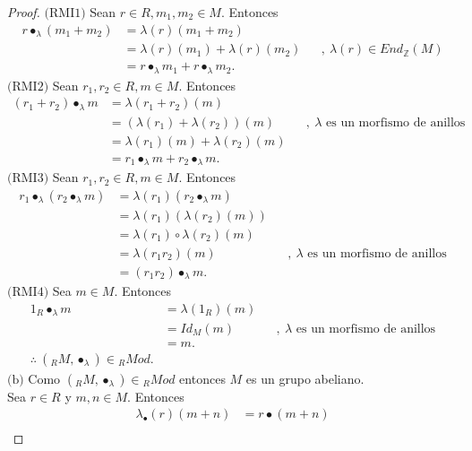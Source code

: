 \documentclass{article}
\newcommand{\lrprth}[1]{
    \left(#1\right)
}
\newcommand{\zend}[2]{
    End_{\mathbb{Z}}^{#2}\lrprth{#1}
}
\theoremstyle{definition}
\theoremstyle{plain}
\theoremstyle{plain}
\theoremstyle{definition}
\theoremstyle{definition}
\theoremstyle{definition}
\theoremstyle{definition}
\theoremstyle{definition}
\theoremstyle{definition}
\begin{document}
\begin{enumerate}
\begin{proof}
    $\boxed{\text{(RMI1)}}$ Sean $r\in R, m_1,m_2\in M$. Entonces
    \begin{align*}
        r\bullet_{\lambda}\lrprth{m_1+m_2}&=\lambda(r)\lrprth{m_1+m_2}\\
        &=\lambda(r)\lrprth{m_1}+\lambda(r)\lrprth{m_2} && ,\ \lambda(r)\in \zend{M}{}\\
        &=r\bullet_\lambda m_1+r\bullet_\lambda m_2.
    \end{align*}
    $\boxed{\text{(RMI2)}}$ Sean $r_1,r_2\in R, m\in M$. Entonces
    \begin{align*}
        \lrprth{r_1+r_2}\bullet_\lambda m &=\lambda\lrprth{r_1+r_2}\lrprth{m}\\
        &=\lrprth{\lambda(r_1)+\lambda(r_2)}\lrprth{m} && ,\ \lambda\text{ es un morfismo de anillos}\\
        &=\lambda(r_1)\lrprth{m}+\lambda(r_2)\lrprth{m}\\
        &=r_1\bullet_\lambda m+r_2\bullet_\lambda m.
    \end{align*}
    $\boxed{\text{(RMI3)}}$ Sean $r_1,r_2\in R, m\in M$. Entonces
    \begin{align*}
        r_1\bullet_\lambda\lrprth{r_2\bullet_\lambda m}&= \lambda(r_1)\lrprth{r_2\bullet_\lambda m}\\
        &=\lambda(r_1)\lrprth{\lambda(r_2)\lrprth{m}}\\
        &=\lambda(r_1)\circ\lambda(r_2)\lrprth{m}\\
        &=\lambda(r_1r_2)\lrprth{m} && ,\ \lambda\text{ es un morfismo de anillos}\\
        &=\lrprth{r_1r_2}\bullet_\lambda m.
    \end{align*}
    $\boxed{\text{(RMI4)}}$ Sea $m\in M$. Entonces
    \begin{align*}
        1_R\bullet_\lambda m&=\lambda(1_R)\lrprth{m}\\
        &=Id_M\lrprth{m} && ,\ \lambda\text{ es un morfismo de anillos}\\
        &=m.\\
        \therefore\ \lrprth{{}_RM,\bullet_\lambda}\in{}_RMod.
    \end{align*}
    $\boxed{\text{(b)}}$ Como $\lrprth{{}_RM,\bullet_\lambda}\in{}_RMod$ entonces $M$ es un grupo abeliano.\\
    Sea $r\in R$ y $m,n\in M$. Entonces
    \begin{align*}
        \lambda_\bullet(r)\lrprth{m+n}&=r\bullet\lrprth{m+n}\\

\end{align*}
\end{proof}
\end{enumerate}
\end{document}
